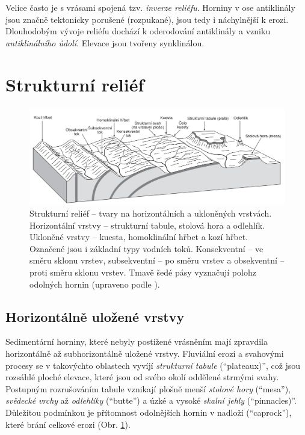 Velice často je s vrásami spojená tzv. \emph{inverze reliéfu}. Horniny v ose antiklinály jsou značně tektonicky porušené (rozpukané), jsou tedy i náchylnější k erozi. Dlouhodobým vývoje reliéfu dochází k oderodování antiklinály a vzniku \emph{antiklinálního údolí}. Elevace jsou tvořeny synklinálou.

\section{Strukturní reliéf}

\begin{figure}[h]
	\centering
	\includegraphics[width=1\linewidth]{obrazky/tectonic/strukturni_tvary}
	\caption{Strukturní reliéf -- tvary na horizontálních a ukloněných vrstvách. Horizontální vrstvy -- strukturní tabule, stolová hora a odlehlík. Ukloněné vrstvy -- kuesta, homoklinální hřbet a kozí hřbet. Označené jsou i základní typy vodních toků. Konsekventní -- ve směru sklonu vrstev, subsekventní -- po směru vrstev a obsekventní -- proti směru sklonu vrstev. Tmavě šedé pásy vyznačují polohz odolných hornin (upraveno podle \textcite{huggettFundamentalsGeomorphology2007}).}
	\label{fig:strukturnitvary}
\end{figure}

\subsection{Horizontálně uložené vrstvy}
Sedimentární horniny, které nebyly postižené vrásněním mají zpravdila horizontálně až subhorizontálně uložené vrstvy. 
Fluviální erozí a svahovými procesy se v takovýchto oblastech vyvíjí \emph{strukturní tabule} (\enquote{plateaux)}, což jsou rozsáhlé ploché elevace, které jsou od svého okolí oddělené strmými svahy. Postupným rozrušováním tabule vznikají plošně menší \emph{stolové hory} (\enquote{mesa}), \emph{svědecké vrchy} až \emph{odlehlíky} (\enquote{butte}) a úzké a vysoké \emph{skalní jehly} (\enquote{pinnacles)}. Důležitou podmínkou je přítomnost odolnějších hornin v nadloží (\enquote{caprock}), které brání celkové erozi (Obr. \ref{fig:strukturnitvary}).

